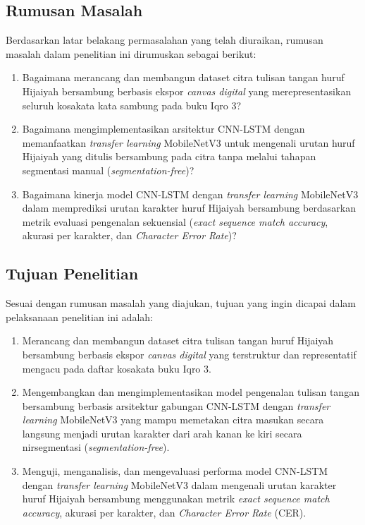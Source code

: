 \documentclass[conference]{IEEEtran}
\begin{document}
\subsection{Rumusan Masalah}
Berdasarkan latar belakang permasalahan yang telah diuraikan, rumusan masalah dalam penelitian ini dirumuskan sebagai berikut:
\begin{enumerate}
    \item Bagaimana merancang dan membangun dataset citra tulisan tangan huruf Hijaiyah bersambung berbasis ekspor \textit{canvas digital} yang merepresentasikan seluruh kosakata kata sambung pada buku Iqro 3?
    \item Bagaimana mengimplementasikan arsitektur CNN-LSTM dengan memanfaatkan \textit{transfer learning} MobileNetV3 untuk mengenali urutan huruf Hijaiyah yang ditulis bersambung pada citra tanpa melalui tahapan segmentasi manual (\textit{segmentation-free})?
    \item Bagaimana kinerja model CNN-LSTM dengan \textit{transfer learning} MobileNetV3 dalam memprediksi urutan karakter huruf Hijaiyah bersambung berdasarkan metrik evaluasi pengenalan sekuensial (\textit{exact sequence match accuracy}, akurasi per karakter, dan \textit{Character Error Rate})?
\end{enumerate}

\subsection{Tujuan Penelitian}
Sesuai dengan rumusan masalah yang diajukan, tujuan yang ingin dicapai dalam pelaksanaan penelitian ini adalah:
\begin{enumerate}
    \item Merancang dan membangun dataset citra tulisan tangan huruf Hijaiyah bersambung berbasis ekspor \textit{canvas digital} yang terstruktur dan representatif mengacu pada daftar kosakata buku Iqro 3.
    \item Mengembangkan dan mengimplementasikan model pengenalan tulisan tangan bersambung berbasis arsitektur gabungan CNN-LSTM dengan \textit{transfer learning} MobileNetV3 yang mampu memetakan citra masukan secara langsung menjadi urutan karakter dari arah kanan ke kiri secara nirsegmentasi (\textit{segmentation-free}).
    \item Menguji, menganalisis, dan mengevaluasi performa model CNN-LSTM dengan \textit{transfer learning} MobileNetV3 dalam mengenali urutan karakter huruf Hijaiyah bersambung menggunakan metrik \textit{exact sequence match accuracy}, akurasi per karakter, dan \textit{Character Error Rate} (CER).
\end{enumerate}
\end{document}
